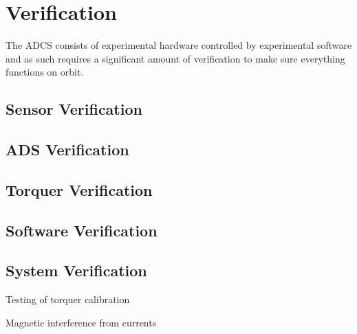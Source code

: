 
\chapter{Verification}

\label{ch:Verification}

The \ac{ADCS} consists of experimental hardware controlled by experimental software and as such requires a significant amount of verification to make sure everything functions on orbit.

\section{Sensor Verification}

\section{\acl{ADS} Verification}

\section{Torquer Verification}

\section{Software Verification}

\section{System Verification}

Testing of torquer calibration

Magnetic interference from currents

